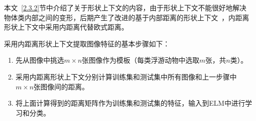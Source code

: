 本文~\ref{2.3.2}节中介绍了关于形状上下文的内容，由于形状上下文不能很好地解决物体类内部之间的变形，后期产生了改进的基于内部距离的形状上下文~\cite{ling2007shape}，内距离形状上下文中采用内距离代替欧式距离。

采用内距离形状上下文提取图像特征的基本步骤如下：
\begin{enumerate}
\item 先从图像中挑选$m\times n$张图像作为模板（每类浮游动物中选取$m$张，共$n$类）。
\item 采用内距离形状上下文分别计算训练集和测试集中所有图像和上一步骤中$m\times n$张图像间的距离。
\item 将上面计算得到的距离矩阵作为训练集和测试集的特征，输入到ELM中进行学习和分类。
\end{enumerate}
